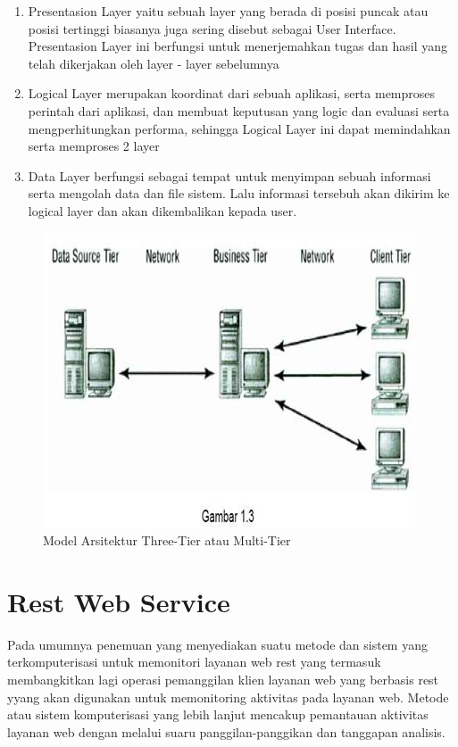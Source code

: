	\begin{enumerate}
		\item Presentasion Layer yaitu sebuah layer yang berada di posisi puncak atau posisi tertinggi biasanya juga sering disebut
		         sebagai User Interface. Presentasion Layer ini berfungsi untuk menerjemahkan tugas dan hasil yang telah dikerjakan
		         oleh layer - layer sebelumnya
		\item Logical Layer merupakan koordinat dari sebuah aplikasi, serta memproses perintah dari aplikasi, dan membuat
		         keputusan yang logic dan evaluasi serta mengperhitungkan performa, sehingga Logical Layer ini dapat memindahkan
		         serta memproses 2 layer
		\item Data Layer berfungsi sebagai tempat untuk menyimpan sebuah informasi serta mengolah data dan file sistem. Lalu
		         informasi tersebuh akan dikirim ke logical layer dan akan dikembalikan kepada user.
	\end{enumerate}

\begin{figure}[ht]
    \centerline{\includegraphics{figures/2model3tier.JPG}}
    \caption{Model Arsitektur Three-Tier atau Multi-Tier}
    \label{3Tier3}
\end{figure}

\section{Rest Web Service}
Pada umumnya penemuan yang menyediakan suatu metode dan sistem yang terkomputerisasi untuk memonitori layanan web rest yang termasuk
membangkitkan lagi operasi pemanggilan klien layanan web yang berbasis rest yyang akan digunakan untuk memonitoring aktivitas pada layanan web.
Metode atau sistem komputerisasi yang lebih lanjut mencakup pemantauan aktivitas layanan web dengan melalui suaru panggilan-panggikan dan tanggapan analisis.

